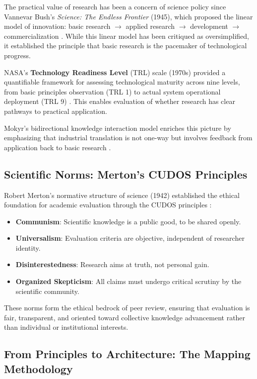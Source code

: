 The practical value of research has been a concern of science policy since Vannevar Bush's \textit{Science: The Endless Frontier} (1945), which proposed the linear model of innovation: basic research $\rightarrow$ applied research $\rightarrow$ development $\rightarrow$ commercialization \citep{bush1945science}. While this linear model has been critiqued as oversimplified, it established the principle that basic research is the pacemaker of technological progress.

NASA's \textbf{Technology Readiness Level} (TRL) scale (1970s) provided a quantifiable framework for assessing technological maturity across nine levels, from basic principles observation (TRL 1) to actual system operational deployment (TRL 9) \citep{nasa1995trl}. This enables evaluation of whether research has clear pathways to practical application.

Mokyr's bidirectional knowledge interaction model enriches this picture by emphasizing that industrial translation is not one-way but involves feedback from application back to basic research \citep{mokyr2002gifts}.

\subsection{Scientific Norms: Merton's CUDOS Principles}

Robert Merton's normative structure of science (1942) established the ethical foundation for academic evaluation through the CUDOS principles \citep{merton1973normative}:

\begin{itemize}
    \item \textbf{Communism}: Scientific knowledge is a public good, to be shared openly.
    \item \textbf{Universalism}: Evaluation criteria are objective, independent of researcher identity.
    \item \textbf{Disinterestedness}: Research aims at truth, not personal gain.
    \item \textbf{Organized Skepticism}: All claims must undergo critical scrutiny by the scientific community.
\end{itemize}

These norms form the ethical bedrock of peer review, ensuring that evaluation is fair, transparent, and oriented toward collective knowledge advancement rather than individual or institutional interests.

\subsection{From Principles to Architecture: The Mapping Methodology}

